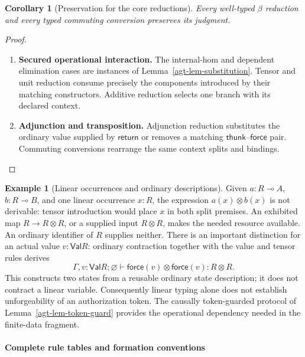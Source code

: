 \documentclass[11pt,a4paper]{article}
\numberwithin{equation}{section}
\newtheorem{corollary}[theorem]{Corollary}
\theoremstyle{definition}
\newtheorem{example}[theorem]{Example}
\theoremstyle{remark}
\theoremstyle{plain}
\providecommand{\Val}{\mathsf{Val}}
\providecommand{\linturn}{\vdash}
\begin{document}
\begin{corollary}[Preservation for the core reductions]
Every well-typed $\beta$ reduction and every typed commuting conversion
preserves its judgment.
\end{corollary}
\begin{proof}
\leavevmode
\begin{enumerate}[label=\textup{(\arabic*)},leftmargin=*,itemsep=4pt,topsep=3pt]
  \item \textbf{Secured operational interaction.} The internal-hom and dependent elimination cases are instances of
Lemma~\ref{agt-lem-substitution}. Tensor and unit reduction consume precisely
the components introduced by their matching constructors. Additive reduction
selects one branch with its declared context.
  \item \textbf{Adjunction and transposition.} Adjunction reduction substitutes
the ordinary value supplied by $\mathsf{return}$ or removes a matching
$\mathsf{thunk}$--$\mathsf{force}$ pair. Commuting conversions rearrange the
same context splits and bindings.
\end{enumerate}
\end{proof}

\begin{example}[Linear occurrences and ordinary descriptions]
Given $a:R\multimap A$, $b:R\multimap B$, and one linear occurrence
$x:R$, the expression $a(x)\otimes b(x)$ is not derivable: tensor
introduction would place $x$ in both split premises. An exhibited map
$R\to R\otimes R$, or a supplied input $R\otimes R$, makes the needed
resource available. An ordinary identifier of $R$ supplies neither.
There is an important distinction for an actual value $v:\Val R$:
ordinary contraction together with the value and tensor rules derives
\[
 \Gamma,v:\Val R;\varnothing\linturn
 \mathsf{force}(v)\otimes\mathsf{force}(v):R\otimes R.
\]
This constructs two states from a reusable ordinary state description;
it does not contract a linear variable. Consequently linear typing alone
does not establish unforgeability of an authorization token. The
causally token-guarded protocol of Lemma~\ref{agt-lem-token-guard}
provides the operational dependency needed in the finite-data fragment.
\end{example}

\paragraph{Complete rule tables and formation conventions}
\label{agt-app-rules}
\end{document}
